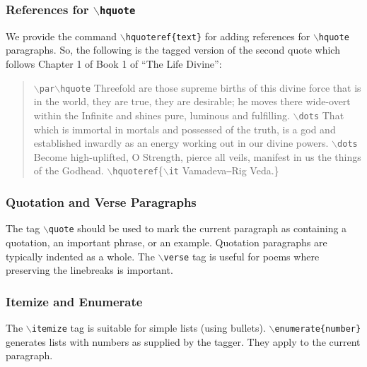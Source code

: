 \documentclass[11pt]{article}
\newcommand{\cmd}[1]{{\tt $\backslash$#1}}
\begin{document}


\subsubsection{References for \cmd{hquote}}

We provide the command \cmd{hquoteref\{text\}} for adding references
for \cmd{hquote} paragraphs. So, the following is the tagged version
of the second quote which follows Chapter 1 of Book 1 of ``The Life
Divine'':

\begin{quote}
  \cmd{par}\cmd{hquote} Threefold are those supreme births of this
  divine force that is in the world, they are true, they are
  desirable; he moves there wide-overt within the Infinite and shines
  pure, luminous and fulfilling. \cmd{dots} That which is immortal in
  mortals and possessed of the truth, is a god and established
  inwardly as an energy working out in our divine powers. \cmd{dots}
  Become high-uplifted, O Strength, pierce all veils, manifest in us
  the things of the Godhead.
  \cmd{hquoteref}\{\cmd{it} Vamadeva{\tt ---}Rig Veda.\}
\end{quote}

\subsubsection{Quotation and Verse Paragraphs}

The tag \cmd{quote} should be used to mark the current paragraph as
containing a quotation, an important phrase, or an example. Quotation
paragraphs are typically indented as a whole. The \cmd{verse} tag is
useful for poems where preserving the linebreaks is important.




\subsubsection{Itemize and Enumerate}

The \cmd{itemize} tag is suitable for simple lists (using
bullets). \cmd{enumerate\{number\}} generates lists with numbers as
supplied by the tagger. They apply to the current paragraph.
\end{document}
